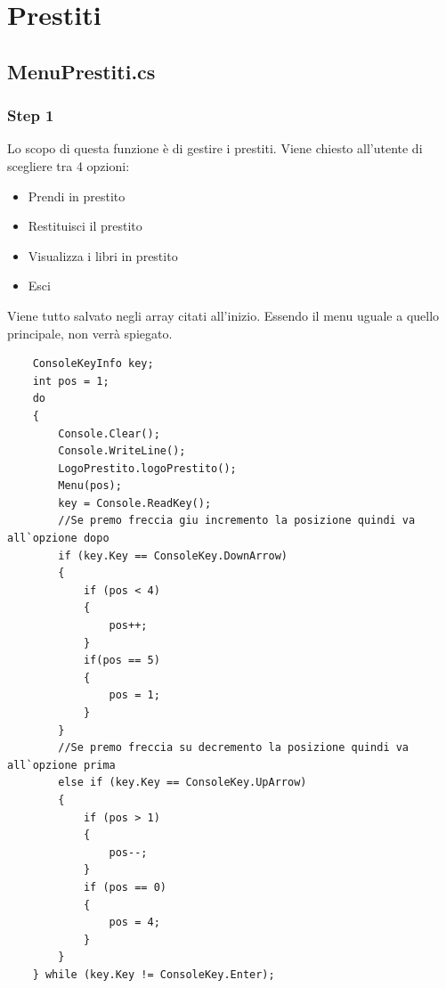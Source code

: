 \documentclass[a4paper,12pt]{article}
\begin{document}
\newpage

\section{Prestiti}
\subsection{MenuPrestiti.cs}
\subsubsection{Step 1}
Lo scopo di questa funzione è di gestire i prestiti.
Viene chiesto all'utente di scegliere tra 4 opzioni:
\begin{itemize}
    \item Prendi in prestito
    \item Restituisci il prestito
    \item Visualizza i libri in prestito
    \item Esci
\end{itemize}

Viene tutto salvato negli array citati all'inizio.
Essendo il menu uguale a quello principale, non verrà spiegato.

\begin{lstlisting}
    ConsoleKeyInfo key;
    int pos = 1;
    do
    {
        Console.Clear();
        Console.WriteLine();
        LogoPrestito.logoPrestito();
        Menu(pos);
        key = Console.ReadKey();
        //Se premo freccia giu incremento la posizione quindi va all`opzione dopo
        if (key.Key == ConsoleKey.DownArrow)
        {
            if (pos < 4)
            {
                pos++;
            }
            if(pos == 5)
            {
                pos = 1;
            }
        }
        //Se premo freccia su decremento la posizione quindi va all`opzione prima
        else if (key.Key == ConsoleKey.UpArrow)
        {
            if (pos > 1)
            {
                pos--;
            }
            if (pos == 0)
            {
                pos = 4;
            }
        }
    } while (key.Key != ConsoleKey.Enter);

\end{lstlisting}

\newpage
\end{document}
